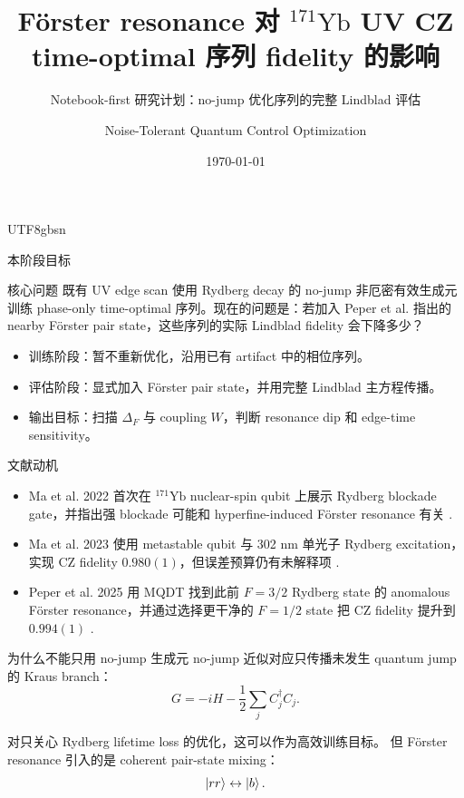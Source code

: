\documentclass[aspectratio=169,11pt]{beamer}
\title[\texorpdfstring{$^{171}$Yb Förster resonance}{171Yb Forster resonance}]%
{Förster resonance 对 \texorpdfstring{$^{171}\mathrm{Yb}$}{171Yb} UV CZ time-optimal 序列 fidelity 的影响}
\subtitle{Notebook-first 研究计划：no-jump 优化序列的完整 Lindblad 评估}
\author{Noise-Tolerant Quantum Control Optimization}
\date{\today}
\newcommand{\ketb}{\ket{b}}
\newcommand{\Dforster}{\Delta_F}
\begin{document}
\begin{CJK*}{UTF8}{gbsn}

\begin{frame}
  \titlepage
\end{frame}

\begin{frame}{本阶段目标}
  \begin{block}{核心问题}
    既有 UV edge scan 使用 Rydberg decay 的 no-jump 非厄密有效生成元训练
    phase-only time-optimal 序列。现在的问题是：若加入 Peper et al. 指出的
    nearby Förster pair state，这些序列的实际 Lindblad fidelity 会下降多少？
  \end{block}

  \begin{itemize}
    \item 训练阶段：暂不重新优化，沿用已有 artifact 中的相位序列。
    \item 评估阶段：显式加入 Förster pair state，并用完整 Lindblad 主方程传播。
    \item 输出目标：扫描 \(\Dforster\) 与 coupling \(W\)，判断 resonance dip 和 edge-time sensitivity。
  \end{itemize}
\end{frame}

\begin{frame}{文献动机}
  \begin{itemize}
    \item Ma et al. 2022 首次在 \({}^{171}\mathrm{Yb}\) nuclear-spin qubit 上展示 Rydberg blockade gate，并指出强 blockade 可能和 hyperfine-induced Förster resonance 有关 \cite{maUniversalGateOperations2022}.
    \item Ma et al. 2023 使用 metastable qubit 与 302 nm 单光子 Rydberg excitation，实现 CZ fidelity \(0.980(1)\)，但误差预算仍有未解释项 \cite{maHighfidelityGatesMidcircuit2023a}.
    \item Peper et al. 2025 用 MQDT 找到此前 \(F=3/2\) Rydberg state 的 anomalous Förster resonance，并通过选择更干净的 \(F=1/2\) state 把 CZ fidelity 提升到 \(0.994(1)\) \cite{peperSpectroscopyModelingYb2025}.
  \end{itemize}
\end{frame}

\begin{frame}{为什么不能只用 no-jump 生成元}
  no-jump 近似对应只传播未发生 quantum jump 的 Kraus branch：
  \[
    G=-iH-\frac12\sum_j C_j^\dagger C_j .
  \]

  对只关心 Rydberg lifetime loss 的优化，这可以作为高效训练目标。
  但 Förster resonance 引入的是 coherent pair-state mixing：
  \[
    \ket{rr}\leftrightarrow \ketb .
  \]


\end{frame}
\end{CJK*}
\end{document}
